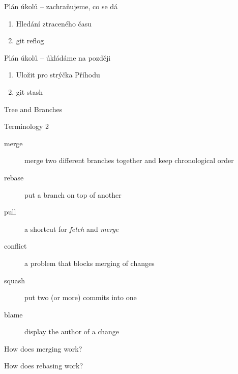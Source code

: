 \documentclass[14pt]{beamer}
\begin{document}
	\begin{frame}{Plán úkolů -- zachraňujeme, co se dá}
		\begin{enumerate}
			\item Hledání ztraceného času
			\item git reflog
		\end{enumerate}
	\end{frame}

	\begin{frame}{Plán úkolů -- úkládáme na později}
	\begin{enumerate}
		\item Uložit pro strýčka Příhodu
		\item git stash
	\end{enumerate}
	\end{frame}

	
	\begin{frame}{Tree and Branches}
    \begin{center}
	\end{center}
	\end{frame}

	\begin{frame}{Terminology 2}
	\begin{description}
		\item[merge] merge two different branches together and keep chronological order
		\item[rebase] put a branch on top of another
		\item[pull] a shortcut for \textit{fetch} and \textit{merge}
		\item[conflict] a problem that blocks merging of changes
		\item[squash] put two (or more) commits into one
		\item[blame] display the author of a change
	\end{description}
	\end{frame}

	\begin{frame}{How does merging work?}
	\begin{center}
	\end{center}
	\end{frame}

	\begin{frame}{How does rebasing work?}
	\begin{center}
	\end{center}
	\end{frame}
\end{document}
